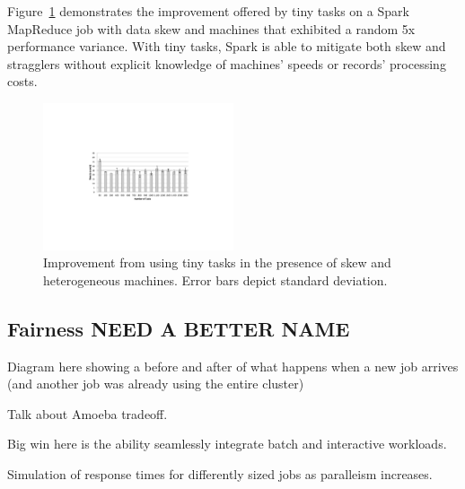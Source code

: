Figure~\ref{fig:sparkskew} demonstrates the improvement offered by tiny tasks on a Spark MapReduce job with data skew and machines that exhibited a random 5x performance variance.
With tiny tasks, Spark is able to mitigate both skew and stragglers without explicit knowledge of machines' speeds or records' processing costs.

\begin{figure}[t]
\centering
\hspace{2ex}
\includegraphics[width=0.5\textwidth]{figures/spark-skew-results}
\vspace{-4ex}
\caption{Improvement from using tiny tasks in the presence of skew and heterogeneous machines.  Error bars depict standard deviation.}
\vspace{-2ex}
\label{fig:sparkskew}
\end{figure}



\subsection{Fairness NEED A BETTER NAME}
Diagram here showing a before and after of what happens when a new job arrives
(and another job was already using the entire cluster)

Talk about Amoeba tradeoff.

Big win here is the ability seamlessly integrate batch and interactive workloads.

Simulation of response times for differently sized jobs as paralleism increases.

